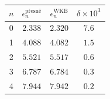 \begin{solution}
\begin{enumerate}
\begin{itemize}
                    \begin{table}[!htb]
                        \centering
                        \begin{tabular}{|c|c|c|c|}
                            \hline
                            $n$
                                & $\epsilon_{n}^{\text{přesně}}$
                                & $\epsilon_{n}^{\text{WKB}}$ 
                                & $\delta\times10^{3}$ \\
                            \hline
                            \hline
                            0
                                & $2.338$
                                & $2.320$
                                & $7.6$\\
                            \hline
                            1
                                & $4.088$
                                & $4.082$
                                & $1.5$ \\
                            \hline
                            2
                                & $5.521$
                                & $5.517$
                                & $0.6$ \\
                            \hline
                            3
                                & $6.787$
                                & $6.784$
                                & $0.3$ \\
                            \hline
                            4
                                & $7.944$
                                & $7.942$
                                & $0.2$ \\
                            \hline
                        \end{tabular}
                        \label{tab:WKBpresne}
                    \end{table}
                

\end{itemize}
\end{enumerate}
\end{solution}

